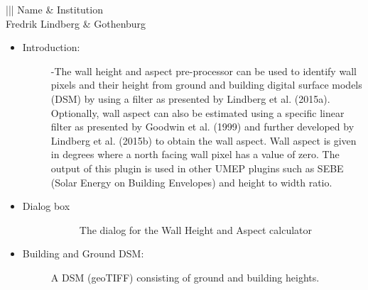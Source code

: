 \documentclass[letterpaper,10pt,english]{sphinxmanual}
\begin{document}
\begin{savenotes}\sphinxattablestart
\centering
\begin{tabular}[t]{|||}
\hline
\sphinxstyletheadfamily 
Name
&\sphinxstyletheadfamily 
Institution
\\
\hline
Fredrik Lindberg
&
Gothenburg
\\
\hline
\end{tabular}
\par
\sphinxattableend\end{savenotes}
\begin{itemize}
\item {} \begin{description}
\item[{Introduction:}] \leavevmode
-The wall height and aspect pre-processor can be used to identify wall pixels and their height from ground and building digital surface models (DSM) by using a filter as presented by Lindberg et al. (2015a). Optionally, wall aspect can also be estimated using a specific linear filter as presented by Goodwin et al. (1999) and further developed by Lindberg et al. (2015b) to obtain the wall aspect. Wall aspect is given in degrees where a north facing wall pixel has a value of zero. The output of this plugin is used in other UMEP plugins such as SEBE (Solar Energy on Building Envelopes) and height to width ratio.

\end{description}

\item {} \begin{description}
\item[{Dialog box}] \leavevmode
\begin{figure}[htbp]
\centering
\capstart

\noindent{}
\caption{The dialog for the Wall Height and Aspect calculator}\label{\detokenize{pre-processor/Urban Geometry Wall Height and Aspect:id1}}\end{figure}

\end{description}

\item {} \begin{description}
\item[{Building and Ground DSM:}] \leavevmode
A DSM (geoTIFF) consisting of ground and building heights.

\end{description}


\end{itemize}
\end{document}
